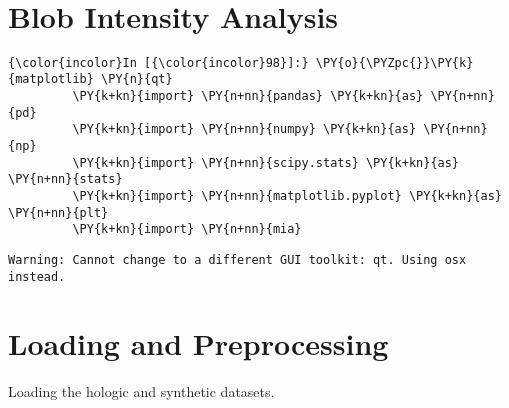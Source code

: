     \begin{center}
    \end{center}
    { \hspace*{\fill} \\}
    
    
\section*{Blob Intensity Analysis}



    \begin{Verbatim}[commandchars=\\\{\}]
{\color{incolor}In [{\color{incolor}98}]:} \PY{o}{\PYZpc{}}\PY{k}{matplotlib} \PY{n}{qt}
         \PY{k+kn}{import} \PY{n+nn}{pandas} \PY{k+kn}{as} \PY{n+nn}{pd}
         \PY{k+kn}{import} \PY{n+nn}{numpy} \PY{k+kn}{as} \PY{n+nn}{np}
         \PY{k+kn}{import} \PY{n+nn}{scipy.stats} \PY{k+kn}{as} \PY{n+nn}{stats}
         \PY{k+kn}{import} \PY{n+nn}{matplotlib.pyplot} \PY{k+kn}{as} \PY{n+nn}{plt}
         \PY{k+kn}{import} \PY{n+nn}{mia}
\end{Verbatim}

    \begin{Verbatim}[commandchars=\\\{\}]
Warning: Cannot change to a different GUI toolkit: qt. Using osx instead.
    \end{Verbatim}

    \section{Loading and Preprocessing}\label{loading-and-preprocessing}

    Loading the hologic and synthetic datasets.

